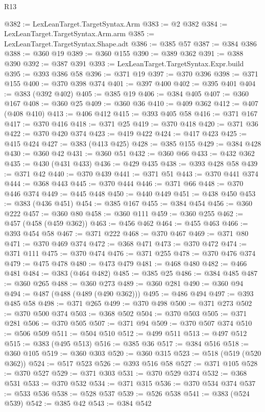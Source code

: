 \begin{lexlean}{R13}
\begin{coremodule}
{{{{{{{{{{{{{{{{{{{{{{{{{{{{{{{{{{{{{{{{{{{{{{{{{{{{{{@382 := LexLeanTarget.TargetSyntax.Arm
@383 := @2 @382
@384 := LexLeanTarget.TargetSyntax.Arm.arm
@385 := LexLeanTarget.TargetSyntax.Shape.adt
@386 := @385 @57
@387 := @384 @386
@388 := @360 @19
@389 := @360 @155
@390 := @389 @362
@391 := @388 @390
@392 := @387 @391
@393 := LexLeanTarget.TargetSyntax.Expr.build
@395 := @393 @386 @58
@396 := @371 @19
@397 := @370 @396
@398 := @371 @155
@400 := @370 @398 @374
@401 := @397 @400
@402 := @395 @401
@404 := @383 (@392 @402)
@405 := @385 @19
@406 := @384 @405
@407 := @360 @167
@408 := @360 @25
@409 := @360 @36
@410 := @409 @362
@412 := @407 (@408 @410)
@413 := @406 @412
@415 := @393 @405 @58
@416 := @371 @167
@417 := @370 @416
@418 := @371 @25
@419 := @370 @418
@420 := @371 @36
@422 := @370 @420 @374
@423 := @419 @422
@424 := @417 @423
@425 := @415 @424
@427 := @383 (@413 @425)
@428 := @385 @155
@429 := @384 @428
@430 := @360 @42
@431 := @360 @51
@432 := @360 @66
@433 := @432 @362
@435 := @430 (@431 @433)
@436 := @429 @435
@438 := @393 @428 @58
@439 := @371 @42
@440 := @370 @439
@441 := @371 @51
@443 := @370 @441 @374
@444 := @368 @443
@445 := @370 @444
@446 := @371 @66
@448 := @370 @446 @374
@449 := @445 @448
@450 := @440 @449
@451 := @438 @450
@453 := @383 (@436 @451)
@454 := @385 @167
@455 := @384 @454
@456 := @360 @222
@457 := @360 @80
@458 := @360 @111
@459 := @360 @255
@462 := @457 (@458 (@459 @362))
@463 := @456 @462
@464 := @455 @463
@466 := @393 @454 @58
@467 := @371 @222
@468 := @370 @467
@469 := @371 @80
@471 := @370 @469 @374
@472 := @368 @471
@473 := @370 @472
@474 := @371 @111
@475 := @370 @474
@476 := @371 @255
@478 := @370 @476 @374
@479 := @475 @478
@480 := @473 @479
@481 := @468 @480
@482 := @466 @481
@484 := @383 (@464 @482)
@485 := @385 @25
@486 := @384 @485
@487 := @360 @265
@488 := @360 @273
@489 := @360 @281
@490 := @360 @94
@494 := @487 (@488 (@489 (@490 @362)))
@495 := @486 @494
@497 := @393 @485 @58
@498 := @371 @265
@499 := @370 @498
@500 := @371 @273
@502 := @370 @500 @374
@503 := @368 @502
@504 := @370 @503
@505 := @371 @281
@506 := @370 @505
@507 := @371 @94
@509 := @370 @507 @374
@510 := @506 @509
@511 := @504 @510
@512 := @499 @511
@513 := @497 @512
@515 := @383 (@495 @513)
@516 := @385 @36
@517 := @384 @516
@518 := @360 @105
@519 := @360 @303
@520 := @360 @315
@523 := @518 (@519 (@520 @362))
@524 := @517 @523
@526 := @393 @516 @58
@527 := @371 @105
@528 := @370 @527
@529 := @371 @303
@531 := @370 @529 @374
@532 := @368 @531
@533 := @370 @532
@534 := @371 @315
@536 := @370 @534 @374
@537 := @533 @536
@538 := @528 @537
@539 := @526 @538
@541 := @383 (@524 @539)
@542 := @385 @42
@543 := @384 @542
}}}}}}}}}}}}}}}}}}}}}}}}}}}}}}}}}}}}}}}}}}}}}}}}}}}}}}
\end{coremodule}
\end{lexlean}
